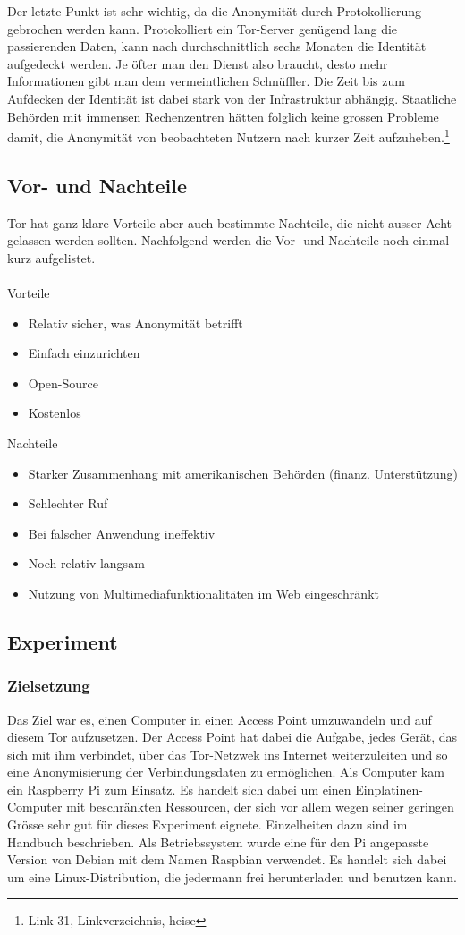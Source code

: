 Der letzte Punkt ist sehr wichtig, da die Anonymität durch Protokollierung gebrochen werden kann. Protokolliert ein Tor-Server genügend lang die passierenden Daten, kann nach durchschnittlich sechs Monaten die Identität aufgedeckt werden. Je öfter man den Dienst also braucht, desto mehr Informationen gibt man dem vermeintlichen Schnüffler. Die Zeit bis zum Aufdecken der Identität ist dabei stark von der Infrastruktur abhängig. Staatliche Behörden mit immensen Rechenzentren hätten folglich keine grossen Probleme damit, die Anonymität von beobachteten Nutzern nach kurzer Zeit aufzuheben.\footnote{Link 31, Linkverzeichnis, heise}

\subsection{Vor- und Nachteile}
Tor hat ganz klare Vorteile aber auch bestimmte Nachteile, die nicht ausser Acht gelassen werden sollten.
Nachfolgend werden die Vor- und Nachteile noch einmal kurz aufgelistet.
\\
\\
Vorteile
\begin{itemize}
\item Relativ sicher, was Anonymität betrifft
\item Einfach einzurichten
\item Open-Source
\item Kostenlos
\end{itemize}

Nachteile
\begin{itemize}
\item Starker Zusammenhang mit amerikanischen Behörden (finanz. Unterstützung)
\item Schlechter Ruf
\item Bei falscher Anwendung ineffektiv
\item Noch relativ langsam
\item Nutzung von Multimediafunktionalitäten im Web eingeschränkt
\end{itemize}

\subsection{Experiment}

\subsubsection{Zielsetzung}
Das Ziel war es, einen Computer in einen Access Point umzuwandeln und auf diesem Tor aufzusetzen.
Der Access Point hat dabei die Aufgabe, jedes Gerät, das sich mit ihm verbindet, über das Tor-Netzwek ins Internet weiterzuleiten und so eine Anonymisierung der Verbindungsdaten zu ermöglichen.
Als Computer kam ein Raspberry Pi zum Einsatz.
Es handelt sich dabei um einen Einplatinen-Computer mit beschränkten Ressourcen, der sich vor allem wegen seiner geringen Grösse sehr gut für dieses Experiment eignete.
Einzelheiten dazu sind im Handbuch beschrieben.
Als Betriebssystem wurde eine für den Pi angepasste Version von Debian mit dem Namen Raspbian verwendet.
Es handelt sich dabei um eine Linux-Distribution, die jedermann frei herunterladen und benutzen kann.

